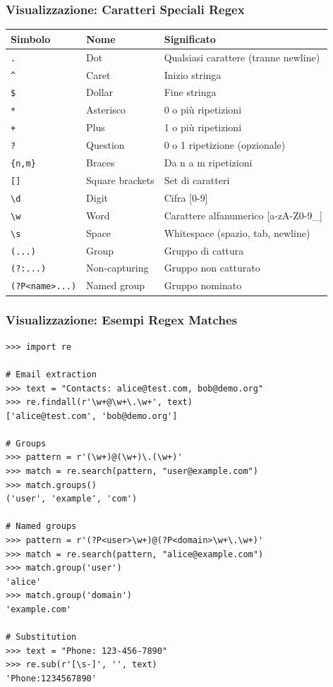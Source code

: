 \subsubsection{Visualizzazione: Caratteri Speciali Regex}

\begin{center}
\begin{tabular}{|l|l|p{6cm}|}
\hline
\textbf{Simbolo} & \textbf{Nome} & \textbf{Significato} \\
\hline
\verb|.| & Dot & Qualsiasi carattere (tranne newline) \\
\hline
\verb|^| & Caret & Inizio stringa \\
\hline
\verb|$| & Dollar & Fine stringa \\
\hline
\verb|*| & Asterisco & 0 o più ripetizioni \\
\hline
\verb|+| & Plus & 1 o più ripetizioni \\
\hline
\verb|?| & Question & 0 o 1 ripetizione (opzionale) \\
\hline
\verb|{n,m}| & Braces & Da n a m ripetizioni \\
\hline
\verb|[]| & Square brackets & Set di caratteri \\
\hline
\verb|\d| & Digit & Cifra [0-9] \\
\hline
\verb|\w| & Word & Carattere alfanumerico [a-zA-Z0-9\_] \\
\hline
\verb|\s| & Space & Whitespace (spazio, tab, newline) \\
\hline
\verb|(...)| & Group & Gruppo di cattura \\
\hline
\verb|(?:...)| & Non-capturing & Gruppo non catturato \\
\hline
\verb|(?P<name>...)| & Named group & Gruppo nominato \\
\hline
\end{tabular}
\end{center}

\subsubsection{Visualizzazione: Esempi Regex Matches}

\begin{tcolorbox}[title=Output Terminal - Regex Examples]
\begin{lstlisting}[style=python]
>>> import re

# Email extraction
>>> text = "Contacts: alice@test.com, bob@demo.org"
>>> re.findall(r'\w+@\w+\.\w+', text)
['alice@test.com', 'bob@demo.org']

# Groups
>>> pattern = r'(\w+)@(\w+)\.(\w+)'
>>> match = re.search(pattern, "user@example.com")
>>> match.groups()
('user', 'example', 'com')

# Named groups
>>> pattern = r'(?P<user>\w+)@(?P<domain>\w+\.\w+)'
>>> match = re.search(pattern, "alice@example.com")
>>> match.group('user')
'alice'
>>> match.group('domain')
'example.com'

# Substitution
>>> text = "Phone: 123-456-7890"
>>> re.sub(r'[\s-]', '', text)
'Phone:1234567890'
\end{lstlisting}
\end{tcolorbox}

